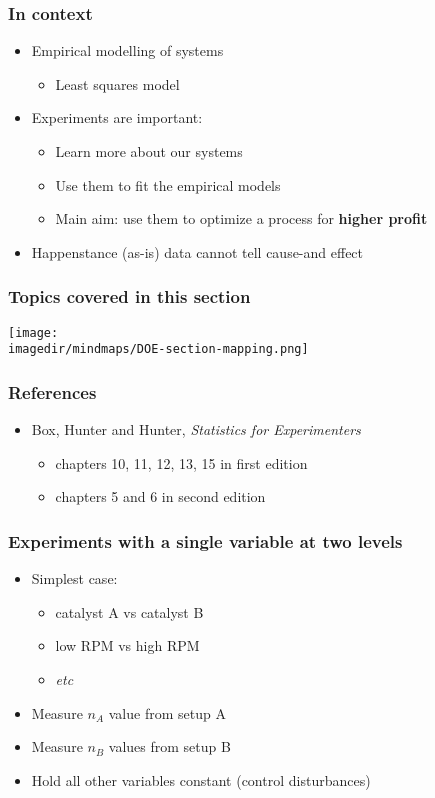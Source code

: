 \begin{frame}\frametitle{In context}
	\begin{itemize}
		\item	Empirical modelling of systems
		\begin{itemize}
			\item	Least squares model
		\end{itemize}
		\item	Experiments are important:
		\begin{itemize}
			\item	Learn more about our systems
			\item	Use them to fit the empirical models
			\item	Main aim: use them to optimize a process for \textbf{higher profit}
		\end{itemize}
		\item	Happenstance (as-is) data cannot tell cause-and effect
	\end{itemize}
\end{frame}

\begin{frame}\frametitle{Topics covered in this section}
	\begin{center}
		\texttt{[image: \\imagedir/mindmaps/DOE-section-mapping.png]}
	\end{center}
\end{frame}

\begin{frame}\frametitle{References}
	\begin{itemize}
		\item	Box, Hunter and Hunter, \emph{Statistics for Experimenters}
		\begin{itemize}
			\item	chapters 10, 11, 12, 13, 15 in first edition
			\item	chapters 5 and 6 in second edition
		\end{itemize}
	\end{itemize}
\end{frame}

\begin{frame}\frametitle{Experiments with a single variable at two levels}
	\begin{itemize}
		\item	Simplest case:
		\begin{itemize}
			\item	catalyst A vs catalyst B
			\item	low RPM vs high RPM
			\item	\emph{etc}
		\end{itemize}
		\item	Measure $n_A$ value from setup A
		\item	Measure $n_B$ values from setup B
		\item	Hold all other variables constant (control disturbances)
	\end{itemize}
\end{frame}

